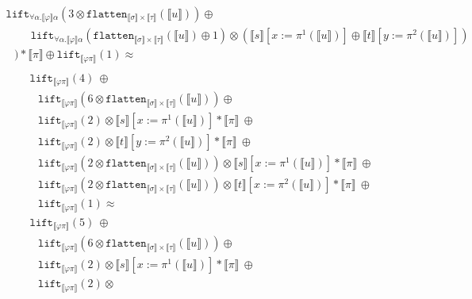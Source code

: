 \documentclass[a4paper,UKenglish,cleveref,autoref,numberwithinsect]{lipics-v2019}
\theoremstyle{definition}
\newcommand{\quant}[2]{\forall #1.#2}
\newcommand{\flatten}{\mathtt{flatten}}
\newcommand{\lift}{\mathtt{lift}}
\newcommand{\typeinterpret}[1]{\llbracket #1 \rrbracket}
\newcommand{\interpret}[1]{\llbracket #1 \rrbracket}
\begin{document}
\begin{itemize}
\[\begin{array}{l}
    \lift_{\quant{\alpha}{\typeinterpret{\varphi}\alpha}}(3 \otimes
      \flatten_{\typeinterpret{\sigma} \times \typeinterpret{\tau}}(
      \interpret{u})) \oplus \\
    \phantom{ABC}
    \lift_{\quant{\alpha}{\typeinterpret{\varphi}\alpha}}(
      \flatten_{\typeinterpret{\sigma} \times \typeinterpret{\tau}}(
      \interpret{u}) \oplus 1) \otimes (
      \interpret{s}[x:=\pi^1(\interpret{u})] \oplus
      \interpret{t}[y:=\pi^2(\interpret{u})]) \\
  \phantom{A}) * \typeinterpret{\pi} \oplus
  \lift_{\typeinterpret{\varphi\pi}}(1) \approx \\
  \end{array}
  \]
  \[
  \begin{array}{l}
  \lift_{\typeinterpret{\varphi\pi}}(4)\ \oplus \\
  \phantom{A}
  \lift_{\typeinterpret{\varphi\pi}}(6 \otimes
      \flatten_{\typeinterpret{\sigma} \times \typeinterpret{\tau}}(
      \interpret{u})) \oplus \\
  \phantom{A}
  \lift_{\typeinterpret{\varphi\pi}}(2) \otimes
    \interpret{s}[x:=\pi^1(\interpret{u})] * \typeinterpret{\pi}\ \oplus\\
  \phantom{A}
  \lift_{\typeinterpret{\varphi\pi}}(2) \otimes
    \interpret{t}[y:=\pi^2(\interpret{u})] * \typeinterpret{\pi}\ \oplus\\
  \phantom{A}
  \lift_{\typeinterpret{\varphi\pi}}(2 \otimes
    \flatten_{\typeinterpret{\sigma} \times \typeinterpret{\tau}}(
      \interpret{u})) \otimes \interpret{s}[x:=\pi^1(\interpret{u})]
      * \typeinterpret{\pi}\ \oplus \\
  \phantom{A}
  \lift_{\typeinterpret{\varphi\pi}}(2 \otimes
    \flatten_{\typeinterpret{\sigma} \times \typeinterpret{\tau}}(
      \interpret{u})) \otimes \interpret{t}[x:=\pi^2(\interpret{u})]
      * \typeinterpret{\pi}\ \oplus \\
  \phantom{A}
  \lift_{\typeinterpret{\varphi\pi}}(1) \approx \\
  \lift_{\typeinterpret{\varphi\pi}}(5)\ \oplus \\
  \phantom{A}
  \lift_{\typeinterpret{\varphi\pi}}(6 \otimes
      \flatten_{\typeinterpret{\sigma} \times \typeinterpret{\tau}}(
      \interpret{u})) \oplus \\
  \phantom{A}
  \lift_{\typeinterpret{\varphi\pi}}(2) \otimes
    \interpret{s}[x:=\pi^1(\interpret{u})] * \typeinterpret{\pi}\ \oplus\\
  \phantom{A}
  \lift_{\typeinterpret{\varphi\pi}}(2) \otimes

\end{array}\]
\end{itemize}
\end{document}
